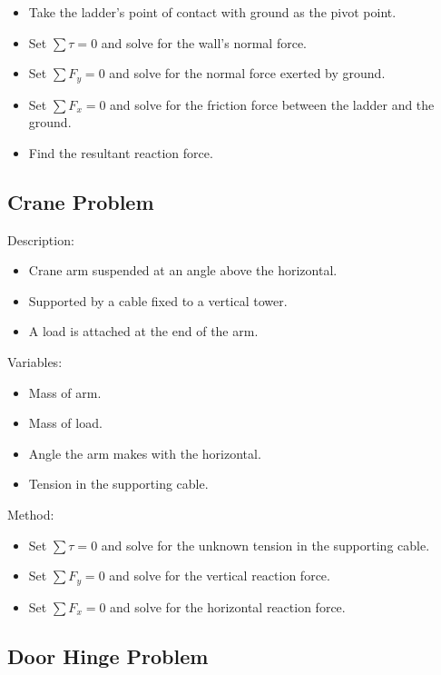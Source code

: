 \documentclass[a4paper,11pt]{article}
\begin{document}
\begin{itemize}
\item Take the ladder's point of contact with ground as the pivot point.
\item Set $\sum \tau = 0$ and solve for the wall's normal force.
\item Set $\sum F_y = 0$ and solve for the normal force exerted by ground.
\item Set $\sum F_x = 0$ and solve for the friction force between the ladder
	and the ground.
\item Find the resultant reaction force.
\end{itemize}


\subsection{Crane Problem}

Description:

\begin{itemize}
\item Crane arm suspended at an angle above the horizontal.
\item Supported by a cable fixed to a vertical tower.
\item A load is attached at the end of the arm.
\end{itemize}

Variables:

\begin{itemize}
\item Mass of arm.
\item Mass of load.
\item Angle the arm makes with the horizontal.
\item Tension in the supporting cable.
\end{itemize}

Method:

\begin{itemize}
\item Set $\sum \tau = 0$ and solve for the unknown tension in the supporting
	cable.
\item Set $\sum F_y = 0$ and solve for the vertical reaction force.
\item Set $\sum F_x = 0$ and solve for the horizontal reaction force.
\end{itemize}


\subsection{Door Hinge Problem}
\end{document}
